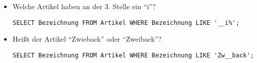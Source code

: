 \documentclass{lehramt-informatik-aufgabe}
\begin{document}
\begin{enumerate}
\begin{itemize}

\item Welche Artikel haben an der 3. Stelle ein “i”?

\begin{antwort}[muster]
\begin{verbatim}
SELECT Bezeichnung FROM Artikel WHERE Bezeichnung LIKE '__i%';
\end{verbatim}
\end{antwort}


\item Heißt der Artikel “Zwieback” oder “Zweiback”?

\begin{antwort}[muster]
\begin{verbatim}
SELECT Bezeichnung FROM Artikel WHERE Bezeichnung LIKE 'Zw__back';
\end{verbatim}
\end{antwort}
\end{itemize}
\end{enumerate}
\end{document}
